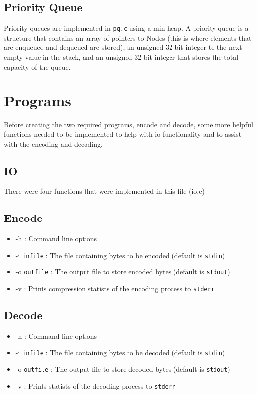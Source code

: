 \documentclass[12pt]{article}
\def\code#1{\texttt{#1}} %
\begin{document}
\subsection{Priority Queue}

Priority queues are implemented in \code{pq.c} using a min heap. A priority queue
is a structure that contains an array of pointers to Nodes (this is where elements
that are enqueued and dequeued are stored), an unsigned 32-bit integer to the next
empty value in the stack, and an unsigned 32-bit integer that stores the total
capacity of the queue.

\section{Programs}

Before creating the two required programs, encode and decode, some more helpful
functions needed to be implemented to help with io functionality and to assist
with the encoding and decoding.

\subsection{IO}

There were four functions that were implemented in this file (io.c)

\subsection{Encode}

\begin{itemize}
    \item{-h : Command line options}
	\item{-i \code{infile} : The file containing bytes to be encoded (default is \code{stdin})}
	\item{-o \code{outfile} : The output file to store encoded bytes (default is \code{stdout})}
	\item{-v : Prints compression statists of the encoding process to \code{stderr}}
\end{itemize}

\subsection{Decode}

\begin{itemize}
    \item{-h : Command line options }
	\item{-i \code{infile} : The file containing bytes to be decoded (default is \code{stdin})}
		\item{-o \code{outfile} : The output file to store decoded bytes (default is \code{stdout})}
	\item{-v : Prints statists of the decoding process to \code{stderr}}
\end{itemize}
\end{document}
